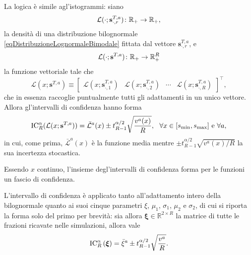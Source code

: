         La logica è simile agl'istogrammi: siano
        \begin{equation*}
          \mathcal L(\cdot;\mathbf s^{T,a}_{\cdot,r})\colon\mathbb R_+\to\mathbb R_+,
        \end{equation*}
        la densità di una distribuzione bilognormale \cref{eqDistribuzioneLognormaleBimodale} fittata dal vettore \(\mathbf s^{T,a}_{\cdot,r}\), e
        \begin{equation*}
          \mathcal L(\cdot;\mathbf s^{T,a})\colon\mathbb R_+\to\mathbb R_+^R
        \end{equation*}
        la funzione vettoriale tale che
        \begin{equation*}
          \mathcal L(x;\mathbf s^{T,a})\equiv
          \begin{bmatrix}
            \mathcal L(x;\mathbf s^{T,a}_{\cdot,1})&
            \mathcal L(x;\mathbf s^{T,a}_{\cdot,2})&
            \cdots&
            \mathcal L(x;\mathbf s^{T,a}_{\cdot,R})
          \end{bmatrix}^\top,
        \end{equation*}
        che in essenza raccoglie puntualmente tutti gli adattamenti in un unico vettore. Allora gl'intervalli di confidenza hanno forma
        \begin{equation*}
          \operatorname{IC}_R^{\alpha}(\mathcal L(x;\mathbf s^{T,a}))=
          \bar{\mathcal L}^a(x)\pm t^{\alpha/2}_{R-1}\sqrt{\frac{v^a(x)}R},
          \ \ \forall x\in[s_{\min},s_{\max}]\text{ e }\forall a,
        \end{equation*}
        in cui, come prima, \(\bar{\mathcal L}^a(x)\) è la funzione media mentre \(\pm t^{\alpha/2}_{R-1}\sqrt{v^a(x)/R}\) la sua incertezza stocastica.

        \begin{oss}
          Essendo \(x\) continuo, l'insieme degl'intervalli di confidenza forma per le funzioni un fascio di confidenza.
        \end{oss}

        \begin{oss}
          \label{ossAdattamentoParametriBilognormale}
          L'intervallo di confidenza è applicato tanto all'adattamento intero della bilognormale quanto ai suoi cinque parametri \(\xi\), \(\mu_1\), \(\sigma_1\), \(\mu_2\) e \(\sigma_2\), di cui si riporta la forma solo del primo per brevità: sia allora \(\boldsymbol\xi\in\mathbb R^{2\times R}\) la matrice di tutte le frazioni ricavate nelle simulazioni, allora vale
          \[
            \operatorname{IC}_R^\alpha\left(\boldsymbol\xi\right)
            =\bar\xi^a\pm t^{\alpha/2}_{R-1}\sqrt{\frac{v^a}R}.
          \]
        \end{oss}

